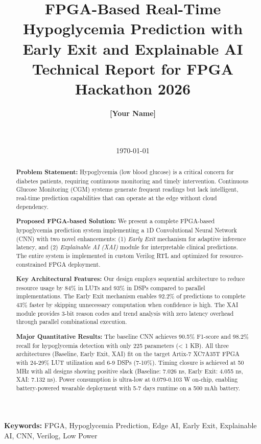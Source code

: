\documentclass[11pt, a4paper]{article}
\title{\textbf{\Large FPGA-Based Real-Time Hypoglycemia Prediction with Early Exit and Explainable AI}\\[0.5cm]
\large Technical Report for FPGA Hackathon 2026}
\author{
    \textbf{[Your Name]}\\
    [Your Email ID]\\
    [Your Affiliation/University]\\
    [City, Country]
}
\date{\today}
\begin{document}
\maketitle

\begin{abstract}
\noindent\textbf{Problem Statement:} Hypoglycemia (low blood glucose) is a critical concern for diabetes patients, requiring continuous monitoring and timely intervention. Continuous Glucose Monitoring (CGM) systems generate frequent readings but lack intelligent, real-time prediction capabilities that can operate at the edge without cloud dependency.

\noindent\textbf{Proposed FPGA-based Solution:} We present a complete FPGA-based hypoglycemia prediction system implementing a 1D Convolutional Neural Network (CNN) with two novel enhancements: (1) \textit{Early Exit} mechanism for adaptive inference latency, and (2) \textit{Explainable AI (XAI)} module for interpretable clinical predictions. The entire system is implemented in custom Verilog RTL and optimized for resource-constrained FPGA deployment.

\noindent\textbf{Key Architectural Features:} Our design employs sequential architecture to reduce resource usage by 84\% in LUTs and 93\% in DSPs compared to parallel implementations. The Early Exit mechanism enables 92.2\% of predictions to complete 43\% faster by skipping unnecessary computation when confidence is high. The XAI module provides 3-bit reason codes and trend analysis with zero latency overhead through parallel combinational execution.

\noindent\textbf{Major Quantitative Results:} The baseline CNN achieves 90.5\% F1-score and 98.2\% recall for hypoglycemia detection with only 225 parameters (< 1 KB). All three architectures (Baseline, Early Exit, XAI) fit on the target Artix-7 XC7A35T FPGA with 24-29\% LUT utilization and 6-9 DSPs (7-10\%). Timing closure is achieved at 50 MHz with all designs showing positive slack (Baseline: 7.026 ns, Early Exit: 4.055 ns, XAI: 7.132 ns). Power consumption is ultra-low at 0.079-0.103 W on-chip, enabling battery-powered wearable deployment with 5-7 days runtime on a 500 mAh battery.

\end{abstract}

\textbf{Keywords:} FPGA, Hypoglycemia Prediction, Edge AI, Early Exit, Explainable AI, CNN, Verilog, Low Power

\newpage
\tableofcontents
\newpage
\end{document}
